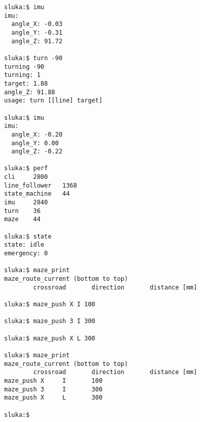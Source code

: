 \documentclass[a4paper,11pt]{article}
\begin{document}
\begin{appendices}
\begin{lstlisting}[style=terminal]
sluka:$ imu
imu:
  angle_X: -0.03
  angle_Y: -0.31
  angle_Z: 91.72

sluka:$ turn -90
turning -90
turning: 1
target: 1.88
angle_Z: 91.88
usage: turn [[line] target]

sluka:$ imu
imu:
  angle_X: -0.20
  angle_Y: 0.00
  angle_Z: -0.22

sluka:$ perf
cli     2800
line_follower   1368
state_machine   44
imu     2840
turn    36
maze    44

sluka:$ state
state: idle
emergency: 0

sluka:$ maze_print
maze_route_current (bottom to top)
        crossroad       direction       distance [mm]

sluka:$ maze_push X I 100

sluka:$ maze_push 3 I 300

sluka:$ maze_push X L 300

sluka:$ maze_print
maze_route_current (bottom to top)
        crossroad       direction       distance [mm]
maze_push X     I       100
maze_push 3     I       300
maze_push X     L       300

sluka:$
    \end{lstlisting}
\end{appendices}
\end{document}

